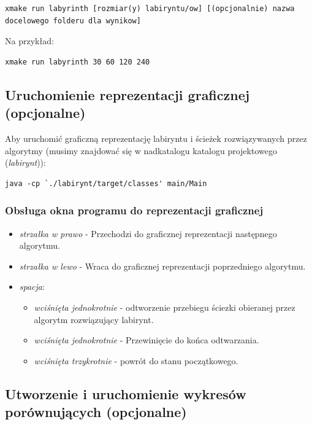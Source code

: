 \documentclass{article}
\begin{document}
\begin{lstlisting}
xmake run labyrinth [rozmiar(y) labiryntu/ow] [(opcjonalnie) nazwa docelowego folderu dla wynikow]
\end{lstlisting}

Na przykład:

\begin{lstlisting}
xmake run labyrinth 30 60 120 240
\end{lstlisting}

\subsection{Uruchomienie reprezentacji graficznej (opcjonalne)}

Aby uruchomić graficzną reprezentację labiryntu i ścieżek rozwiązywanych przez algorytmy (musimy znajdować się w nadkatalogu katalogu projektowego (\textit{labirynt})):

\begin{lstlisting}
java -cp `./labirynt/target/classes' main/Main
\end{lstlisting}

\subsubsection{Obsługa okna programu do reprezentacji graficznej}

\begin{itemize}
        \item \textit{strzałka w prawo} - Przechodzi do graficznej reprezentacji następnego algorytmu.
        \item \textit{strzałka w lewo} - Wraca do graficznej reprezentacji poprzedniego algorytmu.
        \item \textit{spacja}: 
        \begin{itemize}
        	\item \textit{wciśnięta jednokrotnie} - odtworzenie przebiegu ściezki obieranej przez algorytm rozwiązujący labirynt.
        	\item \textit{wciśnięta jednokrotnie} - Przewinięcie do końca odtwarzania.
        	\item \textit{wciśnięta trzykrotnie} - powrót do stanu początkowego.
        \end{itemize}
\end{itemize}

\subsection{Utworzenie i uruchomienie wykresów porównujących (opcjonalne)}
\end{document}
